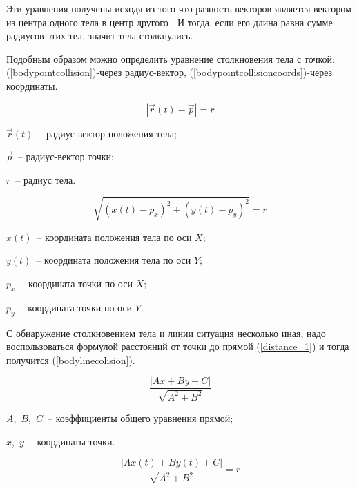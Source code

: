 Эти уравнения получены исходя из того что разность векторов является вектором из центра одного тела в центр другого \cite[с. 39]{mathforprogrammers}.
И тогда, если его длина равна сумме радиусов этих тел, значит тела столкнулись.

Подобным образом можно определить уравнение столкновения тела с точкой:
(\ref{bodypointcollision})-через радиус-вектор, (\ref{bodypointcollisioncoords})-через координаты.

\begin{equation}\label{bodypointcollision}
  \left|\vec{r}(t) - \vec{p}\right| = r
\end{equation}
\begin{Underequation}
  \(\vec{r}(t)\)~-- радиус-вектор положения тела;

  \(\vec{p}\)~-- радиус-вектор точки;

  \(r\)~-- радиус тела.
\end{Underequation}

\begin{equation}\label{bodypointcollisioncoords}
  \sqrt{(x(t) - p_x)^2 + (y(t) - p_y)^2} = r
\end{equation}

\begin{Underequation}
  \(x(t)\)~-- координата положения тела по оси \(X\);

  \(y(t)\)~-- координата положения тела по оси \(Y\);

  \(p_x\)~-- координата точки по оси \(X\);

  \(p_y\)~-- координата точки по оси \(Y\).
\end{Underequation}

С обнаружение столкновением тела и линии ситуация несколько иная,
надо воспользоваться формулой расстояний от точки до прямой (\ref{distance_1}) \cite[с. 452]{larson}
и тогда получится (\ref{bodylinecolision}).

\begin{equation}\label{distance_1}
  \frac{\left|Ax + By + C\right|}{\sqrt{A^2 + B^2}}
\end{equation}

\begin{Underequation}
  \(A\),~\(B\),~\(C\)~-- коэффициенты общего уравнения прямой;

  \(x\),~\(y\)~-- координаты точки.
\end{Underequation}

\begin{equation}\label{bodylinecolision}
  \frac{\left|A x(t) + B y(t) + C\right|}{\sqrt{A^2 + B^2}} = r
\end{equation}

